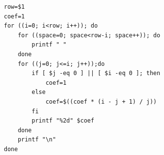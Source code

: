 \begin{verbatim}
row=$1
coef=1
for ((i=0; i<row; i++)); do 
    for ((space=0; space<row-i; space++)); do
        printf " "
    done
    for ((j=0; j<=i; j++));do 
        if [ $j -eq 0 ] || [ $i -eq 0 ]; then
            coef=1
        else
            coef=$((coef * (i - j + 1) / j))
        fi
        printf "%2d" $coef
    done 
    printf "\n"
done
\end{verbatim}